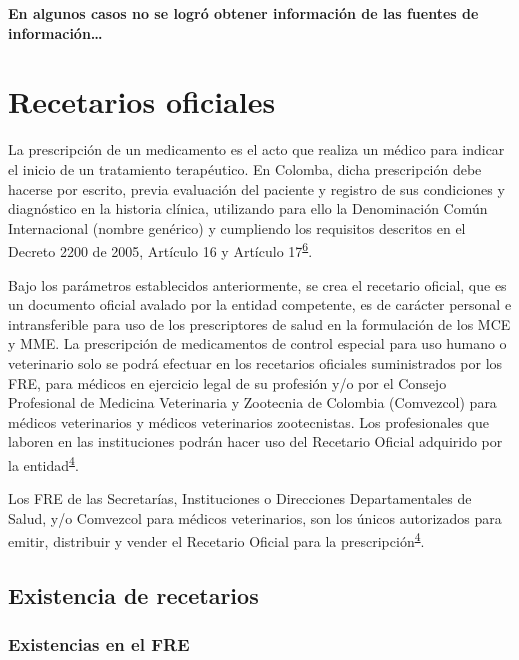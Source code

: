 \documentclass[
]{book}
\begin{document}
\textbf{En algunos casos no se logró obtener información de las fuentes de información\ldots{}}

\hypertarget{recetarios-oficiales}{%
\chapter{Recetarios oficiales}\label{recetarios-oficiales}}


La prescripción de un medicamento es el acto que realiza un médico para indicar el inicio de un tratamiento terapéutico. En Colomba, dicha prescripción debe hacerse por escrito, previa evaluación del paciente y registro de sus condiciones y diagnóstico en la historia clínica, utilizando para ello la Denominación Común Internacional (nombre genérico) y cumpliendo los requisitos descritos en el Decreto 2200 de 2005, Artículo 16 y Artículo 17\textsuperscript{\protect\hyperlink{ref-MSPS2200-2005}{6}}.

Bajo los parámetros establecidos anteriormente, se crea el recetario oficial, que es un documento oficial avalado por la entidad competente, es de carácter personal e intransferible para uso de los prescriptores de salud en la formulación de los MCE y MME. La prescripción de medicamentos de control especial para uso humano o veterinario solo se podrá efectuar en los recetarios oficiales suministrados por los FRE, para médicos en ejercicio legal de su profesión y/o por el Consejo Profesional de Medicina Veterinaria y Zootecnia de Colombia (Comvezcol) para médicos veterinarios y médicos veterinarios zootecnistas. Los profesionales que laboren en las instituciones podrán hacer uso del Recetario Oficial adquirido por la entidad\textsuperscript{\protect\hyperlink{ref-MSPS1478-2006}{4}}.

Los FRE de las Secretarías, Instituciones o Direcciones Departamentales de Salud, y/o Comvezcol para médicos veterinarios, son los únicos autorizados para emitir, distribuir y vender el Recetario Oficial para la prescripción\textsuperscript{\protect\hyperlink{ref-MSPS1478-2006}{4}}.

\hypertarget{existencia-de-recetarios}{%
\section{Existencia de recetarios}\label{existencia-de-recetarios}}

\hypertarget{existencias-en-el-fre}{%
\subsection{Existencias en el FRE}\label{existencias-en-el-fre}}
\end{document}
